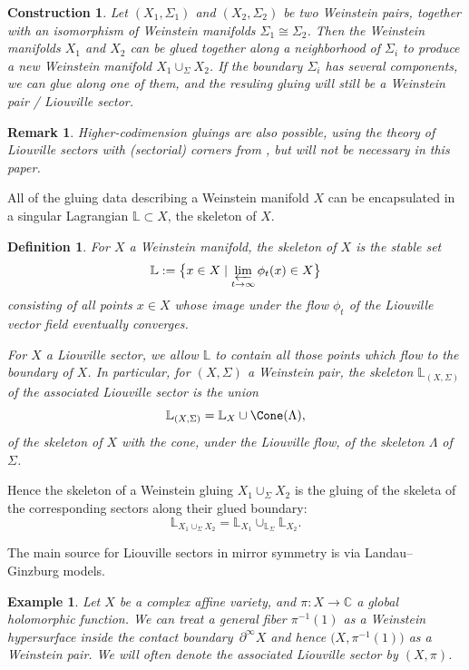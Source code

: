 \documentclass[10pt,a4paper]{amsart}
\numberwithin{equation}{section}
\newtheorem{Construction}[Theorem]{Construction}
\newtheorem{Definition}[Theorem]{Definition}
\newtheorem{Example}[Theorem]{Example}
\newtheorem{Remark}[Theorem]{Remark} }
\def\CC{\mathbb{C}}
\def\LL{\mathbb{L}}
\begin{document}
\begin{Construction}
 Let $(X_1,\Sigma_1)$ and $(X_2,\Sigma_2)$ be two Weinstein pairs, together with an isomorphism of Weinstein manifolds $\Sigma_1\cong \Sigma_2$. Then the Weinstein manifolds $X_1$ and $X_2$ can be glued together along a neighborhood of $\Sigma_i$ to produce a new Weinstein manifold $X_1\cup_\Sigma X_2$. If the boundary $\Sigma_i$ has several components, we can glue along one of them, and the resuling gluing will still be a Weinstein pair / Liouville sector.
\end{Construction}
\begin{Remark}
 Higher-codimension gluings are also possible, using the theory of Liouville sectors with (sectorial) corners from \cite{GPS2}, but will not be necessary in this paper.
\end{Remark}

All of the gluing data describing a Weinstein manifold $X$ can be encapsulated in a singular Lagrangian $\LL\subset X$, the skeleton of $X$.
\begin{Definition}
 For $X$ a Weinstein manifold, the {\em skeleton} of $X$ is the stable set
 \[
 \LL := \big\{x\in X\mid \varprojlim_{t\to \infty}\phi_t(x) \in X\big\}
 \]
 consisting of all points $x\in X$ whose image under the flow $\phi_t$ of the Liouville vector field eventually converges.

 For $X$ a Liouville sector, we allow $\LL$ to contain all those points which flow to the boundary of $X$.
	In particular, for $(X,\Sigma)$ a Weinstein pair, the {\em skeleton} $\LL_{(X,\Sigma)}$ of the associated Liouville sector is the union
 \[\LL_{(X,\Sigma)} = \LL_X\cup \Cone(\Lambda),\]
 of the skeleton of $X$ with the cone, under the Liouville flow, of the skeleton $\Lambda$ of $\Sigma$.
\end{Definition}



Hence the skeleton of a Weinstein gluing $X_1\cup_\Sigma X_2$ is the gluing of the skeleta of the corresponding sectors along their glued boundary:
\[
\LL_{X_1\cup_\Sigma X_2} = \LL_{X_1}\cup_{\LL_{\Sigma}}\LL_{X_2}.
\]

The main source for Liouville sectors in mirror symmetry is via Landau--Ginzburg models.
\begin{Example}
 Let $X$ be a complex affine variety, and $\pi\colon X\to \CC$ a global holomorphic function. We can treat a general fiber $\pi^{-1}(1)$ as a Weinstein hypersurface inside the contact boun\-dary~$\partial^\infty X$ and hence $\big(X,\pi^{-1}(1)\big)$ as a Weinstein pair. We will often denote the associated Liouville sector by $(X,\pi)$.
\end{Example}
\end{document}

